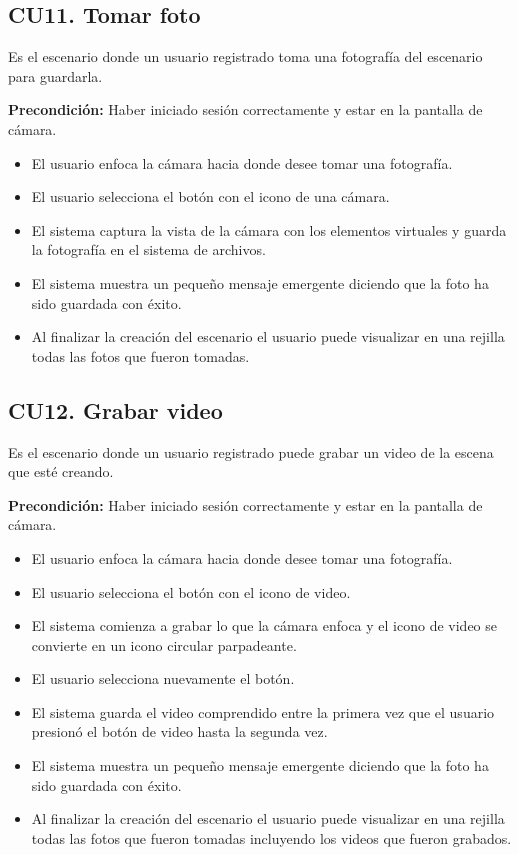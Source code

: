 \subsection{CU11. Tomar foto}\par
Es el escenario donde un usuario registrado toma una fotografía del escenario para guardarla.\par
\textbf{Precondición:} Haber iniciado sesión correctamente y estar en la pantalla de cámara.\par
\begin{itemize}
	\item El usuario enfoca la cámara hacia donde desee tomar una fotografía.
	\item El usuario selecciona el botón con el icono de una cámara.
	\item El sistema captura la vista de la cámara con los elementos virtuales y guarda la fotografía en el sistema de archivos.
	\item El sistema muestra un pequeño mensaje emergente diciendo que la foto ha sido guardada con éxito.
	\item Al finalizar la creación del escenario el usuario puede visualizar en una rejilla todas las fotos que fueron tomadas.
\end{itemize}

\subsection{CU12. Grabar video}\par
Es el escenario donde un usuario registrado puede grabar un video de la escena que esté creando.\par
\textbf{Precondición:} Haber iniciado sesión correctamente y estar en la pantalla de cámara.\par
\begin{itemize}
	\item El usuario enfoca la cámara hacia donde desee tomar una fotografía.
	\item El usuario selecciona el botón con el icono de video.
	\item El sistema comienza a grabar lo que la cámara enfoca y el icono de video se convierte en un icono circular parpadeante.
	\item El usuario selecciona nuevamente el botón.
	\item El sistema guarda el video comprendido entre la primera vez que el usuario presionó el botón de video hasta la segunda vez.
	\item El sistema muestra un pequeño mensaje emergente diciendo que la foto ha sido guardada con éxito.
	\item Al finalizar la creación del escenario el usuario puede visualizar en una rejilla todas las fotos que fueron tomadas incluyendo los videos que fueron grabados.
\end{itemize}

